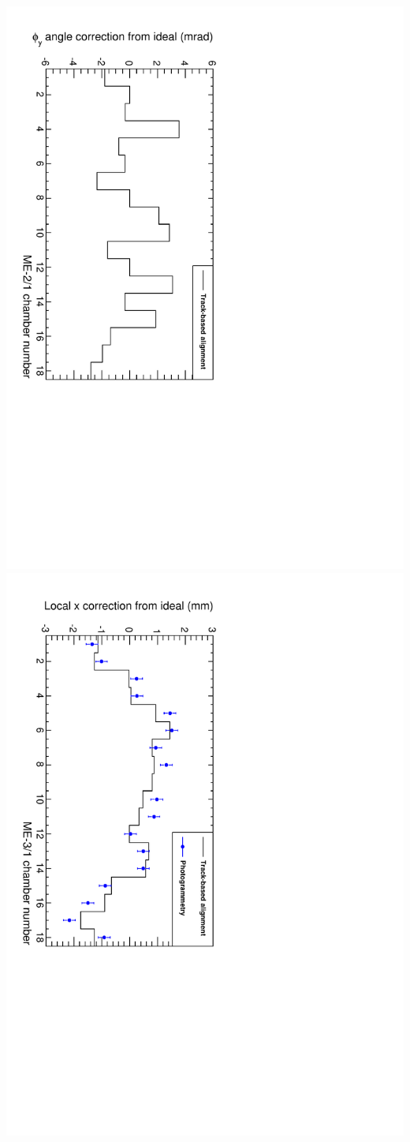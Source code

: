 \documentclass[compress]{beamer}
\begin{document}
\begin{frame}
\begin{columns}
\includegraphics[height=0.95\linewidth, angle=90]{compare_m21_phiy.pdf} \\
\includegraphics[height=0.95\linewidth, angle=90]{compare_m31_x.pdf} \\

\end{columns}
\end{frame}
\end{document}
